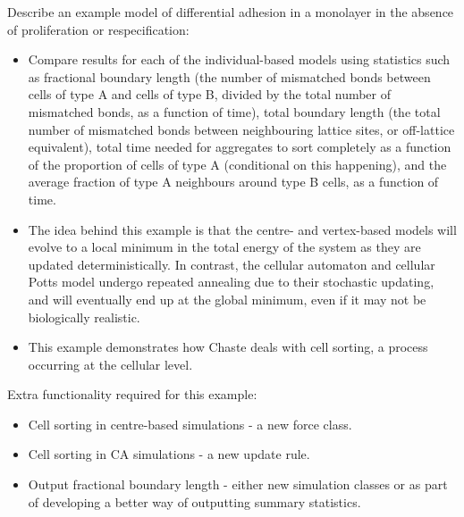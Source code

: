 \documentclass{article}
\begin{document}
\noindent Describe an example model of differential adhesion in a monolayer in the absence of proliferation or respecification:
\begin{itemize}
\item Compare results for each of the individual-based models using statistics such as fractional boundary length (the number of mismatched bonds between cells of type A and cells of type B, divided by the total number of mismatched bonds, as a function of time), total boundary length (the total number of mismatched bonds between neighbouring lattice sites, or off-lattice equivalent), total time needed for aggregates to sort completely as a function of the proportion of cells of type A (conditional on this happening), and the average fraction of type A neighbours around type B cells, as a function of time.
\item The idea behind this example is that the centre- and vertex-based models will evolve to a local minimum in the total energy of the system as they are updated deterministically. In contrast, the cellular automaton and cellular Potts model undergo repeated annealing due to their stochastic updating, and will eventually end up at the global minimum, even if it may not be biologically realistic.
\item This example demonstrates how Chaste deals with cell sorting, a process occurring at the cellular level.
\end{itemize}

\noindent Extra functionality required for this example:
\begin{itemize}
\item Cell sorting in centre-based simulations - a new force class.
\item Cell sorting in CA simulations - a new update rule.
\item Output fractional boundary length - either new simulation classes or as part of developing a better way of outputting summary statistics.
\end{itemize}
\end{document}
